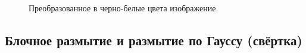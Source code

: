 \documentclass[a5paper, 10pt]{article}
\theoremstyle{definition}
\theoremstyle{plain}
\theoremstyle{remark}
\begin{document}
\begin{figure}[h!]
\caption{Преобразованное в черно-белые цвета изображение. }
\end{figure}

\newpage
\subsection{Блочное размытие и размытие по Гауссу (свёртка)}
\end{document}

